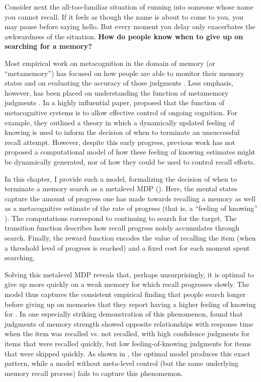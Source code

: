 \documentclass[11pt,a4paperpaper,]{article}
\begin{document}
Consider next the all-too-familiar situation of running into someone whose name you cannot recall. If it feels as though the name is about to come to you, you may pause before saying hello. But every moment you delay only exacerbates the awkwardness of the situation. \textbf{How do people know when to give up on searching for a memory?}

Most empirical work on metacognition in the domain of memory (or ``metamemory'') has focused on how people are able to monitor their memory states \citep{reder1992determines,eakin2005illusions} and on evaluating the accuracy of those judgments \citep{hart1965memory,vesonder1985ability,dunlosky2007metacomprehension}. Less emphasis, however, has been placed on understanding the function of metamemory judgments \citep{schwartz2017metamemory}. In a highly influential paper, \citet{nelson1990metamemory} proposed that the function of metacognitive systems is to allow effective control of ongoing cognition. For example, they outlined a theory in which a dynamically updated feeling of knowing is used to inform the decision of when to terminate an unsuccessful recall attempt. However, despite this early progress, previous work has not proposed a computational model of how these feeling of knowing estimates might be dynamically generated, nor of how they could be used to control recall efforts. 

In this chapter, I provide such a model, formalizing the decision of when to terminate a memory search as a metalevel MDP (). Here, the mental states capture the amount of progress one has made towards recalling a memory as well as a metacognitive estimate of the rate of progress (that is, a ``feeling of knowing'' \citealp{hart1965memory}). The computations correspond to continuing to search for the target. The transition function describes how recall progress noisly accumulates through search. Finally, the reward function encodes the value of recalling the item (when a threshold level of progress is reached) and a fixed cost for each moment spent searching.

Solving this metalevel MDP reveals that, perhaps unsurprisingly, it is optimal to give up more quickly on a weak memory for which recall progresses slowly. The model thus captures the consistent empirical finding that people search longer before giving up on memories that they report having a higher feeling of knowing for \citealp{nelson1984comparison,nhouyvanisvong1998rapid,gruneberg1977methodological,lachman1979metamemory}. In one especially striking demonstration of this phenomenon, \citet{costermans1992confidence} found that judgments of memory strength showed opposite relationships with response time when the item was recalled vs. not recalled, with high confidence judgments for items that were recalled quickly, but low feeling-of-knowing judgments for items that were skipped quickly. As shown in , the optimal model produces this exact pattern, while a model without meta-level control (but the same underlying memory recall process) fails to capture this phenomemon.
\end{document}
